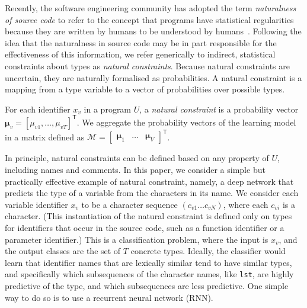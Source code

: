 \documentclass[acmsmall, review, anonymous]{acmart}\settopmatter{printfolios=true,printccs=false,printacmref=false}
\begin{document}
Recently, the software engineering
community has adopted the term \emph{naturalness of source code} to refer to
the concept that programs have statistical regularities because
they are written by humans to be
understood by humans~\citep{hindle12}.
Following the idea that the naturalness in source code may be in part responsible
for the effectiveness of this information, we
refer generically to indirect, statistical
constraints about types as \emph{natural constraints}.
Because natural constraints are uncertain, they are naturally formalised
as probabilities.
A natural constraint is a mapping from a type variable to a vector
of probabilities
over possible types.
\begin{definition}\label{eq:natural}
	For each identifier $x_v$ in a program $U$,
	a \emph{natural constraint} is a probability vector $\bm{\mu}_v = [\mu_{v1}, \ldots, \mu_{vT}]^\mathsf{T}$.
	We aggregate the probability vectors of the learning model in a matrix
	defined as $\mathcal{M} = \begin{bmatrix} \bm{\mu}_1 & \ldots & \bm{\mu}_{V} \end{bmatrix}^\mathsf{T}$.
\end{definition}

In principle, natural constraints can be defined based on any property of $U$,
including names and comments.
In this paper, we consider a simple but practically effective example of
natural constraint, namely, a deep network that predicts the type
of a variable from the characters in its name.
We consider each variable identifier $x_v$ to be a character sequence $(c_{v1} \ldots c_{vN})$,
where each $c_{vi}$ is a character.
(This instantiation of the natural constraint is defined
only on types for identifiers that occur in the source code,
such as a function identifier or a parameter identifier.)
This is a classification problem, where the input is $x_v$,
and the output classes are the set of $T$ concrete types.
Ideally, the classifier would learn that identifier names that are lexically similar
tend to have similar types, and specifically which subsequences of the character names,
like \texttt{\small{lst}}, are highly predictive of the type, and which subsequences are less predictive.
One simple way to do so is to use a recurrent neural network (RNN).
\end{document}
